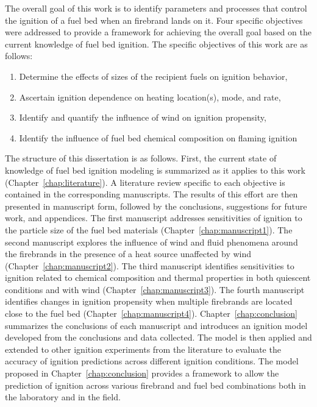     The overall goal of this work is to identify parameters and processes that control the ignition of a fuel bed when an firebrand lands on it. Four specific objectives were addressed to provide a framework for achieving the overall goal based on the current knowledge of fuel bed ignition. The specific objectives of this work are as follows:
        \begin{enumerate}
            \item Determine the effects of sizes of the recipient fuels on ignition behavior,
            \item Ascertain ignition dependence on heating location(s), mode, and rate,
            \item Identify and quantify the influence of wind on ignition propensity,
            \item Identify the influence of fuel bed chemical composition on flaming ignition
        \end{enumerate}
    The structure of this dissertation is as follows. First, the current state of knowledge of fuel bed ignition modeling is summarized as it applies to this work (Chapter~\ref{chap:literature}). A literature review specific to each objective is contained in the corresponding manuscripts. The results of this effort are then presented in manuscript form, followed by the conclusions, suggestions for future work, and appendices. The first manuscript addresses sensitivities of ignition to the particle size of the fuel bed materials (Chapter~\ref{chap:manuscript1}). The second manuscript explores the influence of wind and fluid phenomena around the firebrands in the presence of a heat source unaffected by wind (Chapter~\ref{chap:manuscript2}). The third manuscript identifies sensitivities to ignition related to chemical composition and thermal properties in both quiescent conditions and with wind (Chapter~\ref{chap:manuscript3}). The fourth manuscript identifies changes in ignition propensity when multiple firebrands are located close to the fuel bed (Chapter~\ref{chap:manuscript4}). 
    Chapter~\ref{chap:conclusion} summarizes the conclusions of each manuscript and introduces an ignition model developed from the conclusions and data collected. The model is then applied and extended to other ignition experiments from the literature to evaluate the accuracy of ignition predictions across different ignition conditions. The model proposed in Chapter~\ref{chap:conclusion} provides a framework to allow the prediction of ignition across various firebrand and fuel bed combinations both in the laboratory and in the field. 
    
